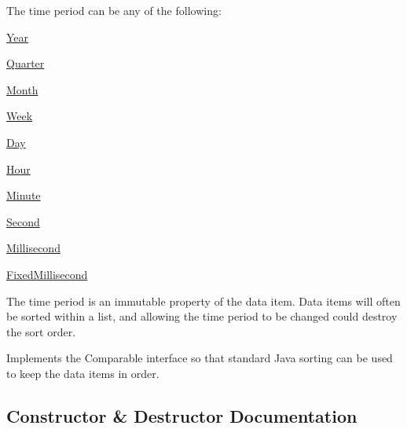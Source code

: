 The time period can be any of the following\+: 
\begin{DoxyItemize}
\item \mbox{\hyperlink{classorg_1_1jfree_1_1data_1_1time_1_1_year}{Year}} 
\item \mbox{\hyperlink{classorg_1_1jfree_1_1data_1_1time_1_1_quarter}{Quarter}} 
\item \mbox{\hyperlink{classorg_1_1jfree_1_1data_1_1time_1_1_month}{Month}} 
\item \mbox{\hyperlink{classorg_1_1jfree_1_1data_1_1time_1_1_week}{Week}} 
\item \mbox{\hyperlink{classorg_1_1jfree_1_1data_1_1time_1_1_day}{Day}} 
\item \mbox{\hyperlink{classorg_1_1jfree_1_1data_1_1time_1_1_hour}{Hour}} 
\item \mbox{\hyperlink{classorg_1_1jfree_1_1data_1_1time_1_1_minute}{Minute}} 
\item \mbox{\hyperlink{classorg_1_1jfree_1_1data_1_1time_1_1_second}{Second}} 
\item \mbox{\hyperlink{classorg_1_1jfree_1_1data_1_1time_1_1_millisecond}{Millisecond}} 
\item \mbox{\hyperlink{classorg_1_1jfree_1_1data_1_1time_1_1_fixed_millisecond}{Fixed\+Millisecond}} 
\end{DoxyItemize}

The time period is an immutable property of the data item. Data items will often be sorted within a list, and allowing the time period to be changed could destroy the sort order. 

Implements the {\ttfamily Comparable} interface so that standard Java sorting can be used to keep the data items in order. 

\subsection{Constructor \& Destructor Documentation}
\mbox{\label{classorg_1_1jfree_1_1data_1_1time_1_1_time_series_data_item_affdb376e559956adcbb595cb3e761ae8}} 
